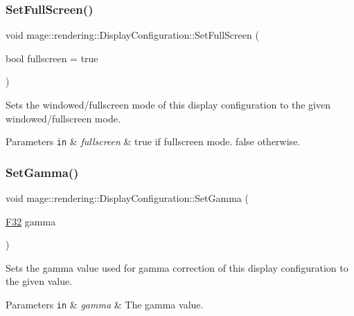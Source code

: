 \subsubsection{\texorpdfstring{Set\+Full\+Screen()}{SetFullScreen()}}
{\footnotesize\ttfamily void mage\+::rendering\+::\+Display\+Configuration\+::\+Set\+Full\+Screen (\begin{DoxyParamCaption}\item[{bool}]{fullscreen = {\ttfamily true} }\end{DoxyParamCaption})\hspace{0.3cm}{\ttfamily [noexcept]}}

Sets the windowed/fullscreen mode of this display configuration to the given windowed/fullscreen mode.


\begin{DoxyParams}[1]{Parameters}
\mbox{\tt in}  & {\em fullscreen} & {\ttfamily true} if fullscreen mode. {\ttfamily false} otherwise. \\
\hline
\end{DoxyParams}
\hypertarget{classmage_1_1rendering_1_1_display_configuration_a1d8d4b2f3b79e53d9b36da3f6a0ddf69}{}\label{classmage_1_1rendering_1_1_display_configuration_a1d8d4b2f3b79e53d9b36da3f6a0ddf69} 
\subsubsection{\texorpdfstring{Set\+Gamma()}{SetGamma()}}
{\footnotesize\ttfamily void mage\+::rendering\+::\+Display\+Configuration\+::\+Set\+Gamma (\begin{DoxyParamCaption}\item[{\hyperlink{namespacemage_aa97e833b45f06d60a0a9c4fc22ae02c0}{F32}}]{gamma }\end{DoxyParamCaption})\hspace{0.3cm}{\ttfamily [noexcept]}}

Sets the gamma value used for gamma correction of this display configuration to the given value.


\begin{DoxyParams}[1]{Parameters}
\mbox{\tt in}  & {\em gamma} & The gamma value. \\
\hline
\end{DoxyParams}
\hypertarget{classmage_1_1rendering_1_1_display_configuration_a304a29762afd99caa1672ef6cc259fb3}{}\label{classmage_1_1rendering_1_1_display_configuration_a304a29762afd99caa1672ef6cc259fb3} 
